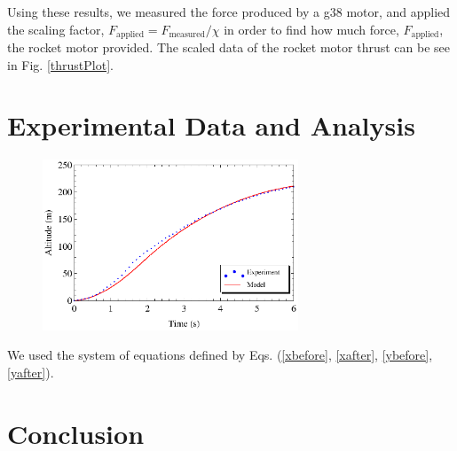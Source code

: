 \documentclass[aps,pra,twocolumn]{revtex4-1}
\begin{document}
Using these results, we measured the force produced by a g38 motor, and applied the scaling factor, $F_\text{applied} = F_\text{measured}/\chi$ in order to find how much force, $F_\text{applied}$, the rocket motor provided.  The scaled data of the rocket motor thrust can be see in Fig. \ref{thrustPlot}. 



\section{\label{section 4} Experimental Data and Analysis}
\begin{figure} [b!]
	\includegraphics[width=3in]{Mirage-G38-BestFit.eps}
	\caption{\label{experiment}}
\end{figure}

We used the system of equations defined by Eqs. (\ref{xbefore}, \ref{xafter}, \ref{ybefore}, \ref{yafter}).


\section{\label{section 5} Conclusion}



\end{document}
